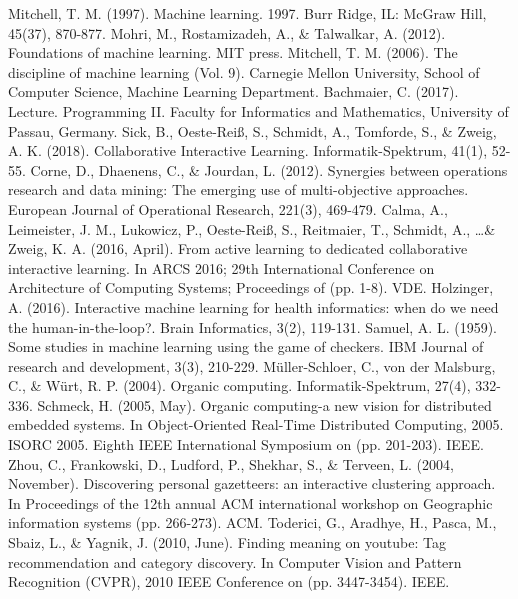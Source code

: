 \documentclass[conference]{IEEEtran}
\begin{document}
\begin{thebibliography}{1}
    Mitchell, T. M. (1997). Machine learning. 1997. Burr Ridge, IL: McGraw Hill, 45(37), 870-877.
    Mohri, M., Rostamizadeh, A., \& Talwalkar, A. (2012). Foundations of machine learning. MIT press.
    Mitchell, T. M. (2006). The discipline of machine learning (Vol. 9). Carnegie Mellon University, School of Computer Science, Machine Learning Department.
    Bachmaier, C. (2017). Lecture. Programming II\@. Faculty for Informatics and Mathematics, University of Passau, Germany.
    Sick, B., Oeste-Rei{\ss}, S., Schmidt, A., Tomforde, S., \& Zweig, A. K. (2018). Collaborative Interactive Learning. Informatik-Spektrum, 41(1), 52-55.
    Corne, D., Dhaenens, C., \& Jourdan, L. (2012). Synergies between operations research and data mining: The emerging use of multi-objective approaches. European Journal of Operational Research, 221(3), 469-479.
    Calma, A., Leimeister, J. M., Lukowicz, P., Oeste-Rei{\ss}, S., Reitmaier, T., Schmidt, A., \dots \& Zweig, K. A. (2016, April). From active learning to dedicated collaborative interactive learning. In ARCS 2016; 29th International Conference on Architecture of Computing Systems; Proceedings of (pp. 1-8). VDE.
    Holzinger, A. (2016). Interactive machine learning for health informatics: when do we need the human-in-the-loop?. Brain Informatics, 3(2), 119-131.
    Samuel, A. L. (1959). Some studies in machine learning using the game of checkers. IBM Journal of research and development, 3(3), 210-229.
    M{\"u}ller-Schloer, C., von der Malsburg, C., \& W{\"u}rt, R. P. (2004). Organic computing. Informatik-Spektrum, 27(4), 332-336.
    Schmeck, H. (2005, May). Organic computing-a new vision for distributed embedded systems. In Object-Oriented Real-Time Distributed Computing, 2005. ISORC 2005. Eighth IEEE International Symposium on (pp. 201-203). IEEE.
    Zhou, C., Frankowski, D., Ludford, P., Shekhar, S., \& Terveen, L. (2004, November). Discovering personal gazetteers: an interactive clustering approach. In Proceedings of the 12th annual ACM international workshop on Geographic information systems (pp. 266-273). ACM.
    Toderici, G., Aradhye, H., Pasca, M., Sbaiz, L., \& Yagnik, J. (2010, June). Finding meaning on youtube: Tag recommendation and category discovery. In Computer Vision and Pattern Recognition (CVPR), 2010 IEEE Conference on (pp. 3447-3454). IEEE.

\end{thebibliography}
\end{document}
